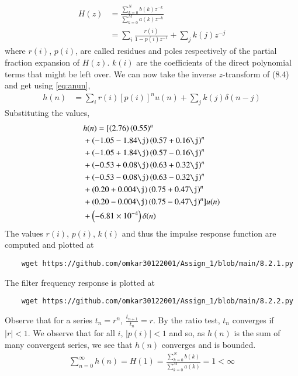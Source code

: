 \documentclass[journal,12pt,twocolumn]{IEEEtran}
\renewcommand\thesection{\arabic{section}}
\begin{document}
\begin{enumerate}[label=\thesection.\arabic*
	,ref=\thesection.\theenumi]
\begin{enumerate}[label=\thesection.\arabic*]
	\begin{align}
		H(z) &= \frac{\sum_{k = 0}^{N}b(k)z^{-k}}{\sum_{k = 0}^{M}a(k)z^{-k}} \\
		&= \sum_{i}\frac{r(i)}{1 - p(i)z^{-1}} + \sum_{j}k(j)z^{-j}
		\label{eq:trans-func}
	\end{align}
	where $r(i)$, $p(i)$, are called residues and poles respectively of the partial 
	fraction expansion of $H(z)$. $k(i)$ are the coefficients of the direct polynomial 
	terms that might be left over. We can now take the inverse $z$-transform of (8.4) and get using \eqref{eq:anun},
	\begin{align}
		h(n) &= \sum_{i}r(i)[p(i)]^nu(n) + \sum_{j}k(j)\delta(n - j)
		\label{eq:h-n-expr}
	\end{align}
	Substituting the values,
	\begin{align}
		&h(n) = [\brak{2.76}\brak{0.55}^n \nonumber \\ 
		&+ \brak{-1.05-1.84\j}\brak{0.57+0.16\j}^n \nonumber \\
		&+ \brak{-1.05+1.84\j}\brak{0.57-0.16\j}^n \nonumber \\
		&+ \brak{-0.53+0.08\j}\brak{0.63+0.32\j}^n \nonumber \\
		&+ \brak{-0.53-0.08\j}\brak{0.63-0.32\j}^n \nonumber \\
		&+ \brak{0.20+0.004\j}\brak{0.75+0.47\j}^n \nonumber \\
		&+ \brak{0.20-0.004\j}\brak{0.75-0.47\j}^n]u(n) \nonumber \\
		&+ \brak{-6.81 \times 10^{-4}}\delta(n)
	\end{align}
	The values $r(i)$, $p(i)$, $k(i)$ and thus the impulse response function are computed and plotted at
	\begin{lstlisting}
	wget https://github.com/omkar30122001/Assign_1/blob/main/8.2.1.py
	\end{lstlisting}
	The filter frequency response is plotted at
	\begin{lstlisting}
	wget https://github.com/omkar30122001/Assign_1/blob/main/8.2.2.py
	\end{lstlisting}
	Observe that for a series $t_n = r^n$, $\frac{t_{n + 1}}{t_n} = r$.
	By the ratio test, $t_n$ converges if $|r| < 1$. We observe that for all $i$, 
	$|p(i)| < 1$ and so, as $h(n)$ is the sum of many convergent series,
	we see that $h(n)$ converges and is bounded.
	\begin{align}
		\sum_{n = 0}^{\infty}h(n) = H(1) = \frac{\sum_{k = 0}^{N}b(k)}{\sum_{k = 0}^{M}a(k)} = 1 < \infty
	\end{align}

\end{enumerate}
\end{enumerate}
\end{document}
